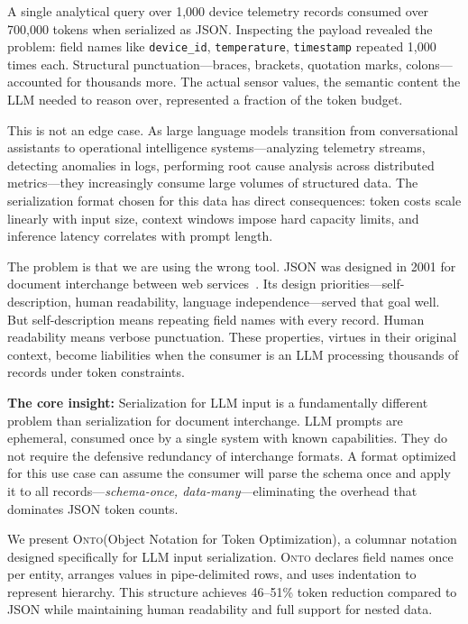 \documentclass[10pt,twocolumn]{article}
\newcommand{\onto}{\textsc{Onto}\xspace}
\begin{document}
A single analytical query over 1,000 device telemetry records consumed over 700,000 tokens when serialized as JSON. Inspecting the payload revealed the problem: field names like \texttt{device\_id}, \texttt{temperature}, \texttt{timestamp} repeated 1,000 times each. Structural punctuation---braces, brackets, quotation marks, colons---accounted for thousands more. The actual sensor values, the semantic content the LLM needed to reason over, represented a fraction of the token budget.

This is not an edge case. As large language models transition from conversational assistants to operational intelligence systems---analyzing telemetry streams, detecting anomalies in logs, performing root cause analysis across distributed metrics---they increasingly consume large volumes of structured data. The serialization format chosen for this data has direct consequences: token costs scale linearly with input size, context windows impose hard capacity limits, and inference latency correlates with prompt length.

The problem is that we are using the wrong tool. JSON was designed in 2001 for document interchange between web services~\citep{rfc8259}. Its design priorities---self-description, human readability, language independence---served that goal well. But self-description means repeating field names with every record. Human readability means verbose punctuation. These properties, virtues in their original context, become liabilities when the consumer is an LLM processing thousands of records under token constraints.

\textbf{The core insight:} Serialization for LLM input is a fundamentally different problem than serialization for document interchange. LLM prompts are ephemeral, consumed once by a single system with known capabilities. They do not require the defensive redundancy of interchange formats. A format optimized for this use case can assume the consumer will parse the schema once and apply it to all records---\emph{schema-once, data-many}---eliminating the overhead that dominates JSON token counts.

We present \onto (Object Notation for Token Optimization), a columnar notation designed specifically for LLM input serialization. \onto declares field names once per entity, arranges values in pipe-delimited rows, and uses indentation to represent hierarchy. This structure achieves 46--51\% token reduction compared to JSON while maintaining human readability and full support for nested data.
\end{document}
